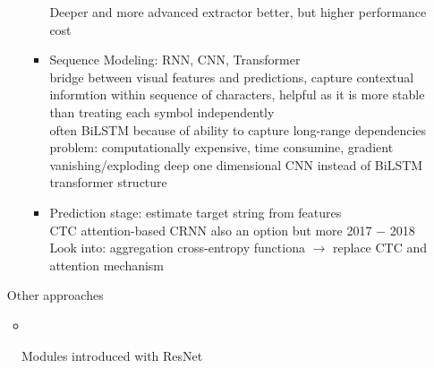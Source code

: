 \begin{itemize}
\begin{itemize}
\begin{itemize}
                        Deeper and more advanced extractor better, but higher performance cost
                    \item Sequence Modeling: RNN, CNN, Transformer \\
                        bridge between visual features and predictions, capture contextual informtion
                        within sequence of characters, helpful as it is more stable than treating each
                        symbol independently\\
                        often BiLSTM because of ability to capture long-range dependencies
                        problem: computationally expensive, time consumine, gradient vanishing/exploding
                        deep one dimensional CNN instead of BiLSTM\\
                        transformer structure
                    \item Prediction stage: estimate target string from features\\
                        CTC
                        attention-based
                        CRNN also an option but more 2017 $-$ 2018
                        Look into: aggregation cross-entropy functiona
                            $\rightarrow$ replace CTC and attention mechanism
                \end{itemize}
        \end{itemize}
        Other approaches
        \begin{itemize}
            \item
        \end{itemize}
\end{itemize}

\begin{figure}[ht]
    \centering
    \caption{Modules introduced with ResNet\label{fig:resnet}}
\end{figure}

